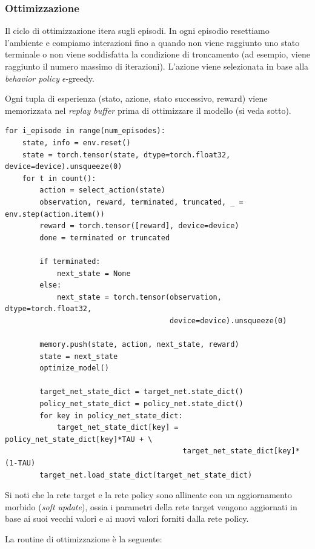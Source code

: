 ﻿\documentclass[11pt, a4paper]{report}
\begin{document}
\subsubsection{Ottimizzazione}
Il ciclo di ottimizzazione itera sugli episodi. In ogni episodio resettiamo l'ambiente e compiamo interazioni fino a quando non viene raggiunto uno stato terminale o non viene soddisfatta la condizione di troncamento (ad esempio, viene raggiunto il numero massimo di iterazioni). L'azione viene selezionata in base alla \emph{behavior policy} $\epsilon$-greedy.

Ogni tupla di esperienza (stato, azione, stato successivo, reward) viene memorizzata nel \emph{replay buffer} prima di ottimizzare il modello (si veda sotto).

\begin{verbatim}
for i_episode in range(num_episodes):
    state, info = env.reset()
    state = torch.tensor(state, dtype=torch.float32, device=device).unsqueeze(0)
    for t in count():
        action = select_action(state)
        observation, reward, terminated, truncated, _ = env.step(action.item())
        reward = torch.tensor([reward], device=device)
        done = terminated or truncated

        if terminated:
            next_state = None
        else:
            next_state = torch.tensor(observation, dtype=torch.float32,
                                      device=device).unsqueeze(0)

        memory.push(state, action, next_state, reward)
        state = next_state
        optimize_model()

        target_net_state_dict = target_net.state_dict()
        policy_net_state_dict = policy_net.state_dict()
        for key in policy_net_state_dict:
            target_net_state_dict[key] = policy_net_state_dict[key]*TAU + \
                                         target_net_state_dict[key]*(1-TAU)
        target_net.load_state_dict(target_net_state_dict)
\end{verbatim}

Si noti che la rete target e la rete policy sono allineate con un aggiornamento morbido (\emph{soft update}), ossia i parametri della rete target vengono aggiornati in base ai suoi vecchi valori e ai nuovi valori forniti dalla rete policy.

La routine di ottimizzazione è la seguente:
\end{document}
